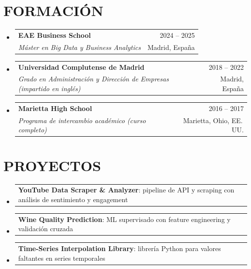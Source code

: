 \documentclass[a4paper,11pt]{article}
\makeatletter
\newcommand{\resumeSubheading}[4]{
  \vspace{-1pt}\item
    \begin{tabular*}{\textwidth}[t]{l@{\extracolsep{\fill}}r}
      \textbf{#1} & {\color{dark-grey}\small #2}\vspace{1pt}\\
      \textit{#3} & {\color{dark-grey}\small #4}\\
    \end{tabular*}\vspace{-5pt}
}
\newcommand{\resumeProject}[3]{
  \item
    \begin{tabular*}{\textwidth}{l@{\extracolsep{\fill}}r}
      \small\textbf{#1}{\small: #2} & {\color{dark-grey}\small #3}\\
    \end{tabular*}\vspace{-6pt}
}
\newcommand{\resumeSubHeadingListStart}{\begin{itemize}[leftmargin=0in, label={}]}
\newcommand{\resumeSubHeadingListEnd}{\end{itemize}}
\makeatother
\begin{document}
\section{FORMACIÓN}
  \resumeSubHeadingListStart
    \resumeSubheading
      {EAE Business School}{2024 -- 2025}
      {Máster en Big Data y Business Analytics}{Madrid, España}
    \resumeSubheading
      {Universidad Complutense de Madrid}{2018 -- 2022}
      {Grado en Administración y Dirección de Empresas (impartido en inglés)}{Madrid, España}
    \resumeSubheading
      {Marietta High School}{2016 -- 2017}
      {Programa de intercambio académico (curso completo)}{Marietta, Ohio, EE.\,UU.}
  \resumeSubHeadingListEnd
\vspace{-2pt}

\section{PROYECTOS}
  \resumeSubHeadingListStart
    \resumeProject{YouTube Data Scraper \& Analyzer}{pipeline de API y scraping con análisis de sentimiento y engagement}{\href{https://github.com/pabblo2000}{\faGithub}}
    \resumeProject{Wine Quality Prediction}{ML supervisado con feature engineering y validación cruzada}{\href{https://github.com/pabblo2000}{\faGithub}}
    \resumeProject{Time-Series Interpolation Library}{librería Python para valores faltantes en series temporales}{\href{https://github.com/pabblo2000}{\faGithub}}
  \resumeSubHeadingListEnd
\end{document}
